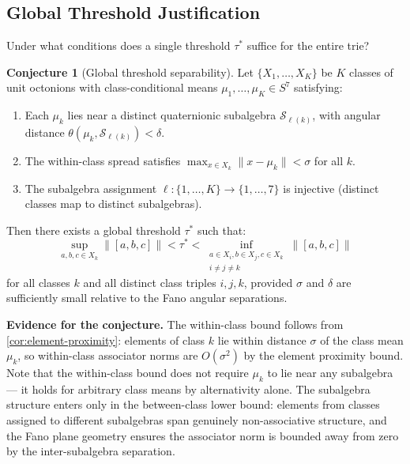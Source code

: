 \documentclass[11pt,a4paper]{article}
\theoremstyle{definition}
\newtheorem{conjecture}[theorem]{Conjecture}
\theoremstyle{remark}
\begin{document}
\subsection{Global Threshold Justification}
\label{sec:global-threshold}

Under what conditions does a single threshold $\tau^*$ suffice for the entire trie?

\begin{conjecture}[Global threshold separability]
\label{conj:global-threshold}
Let $\{X_1, \ldots, X_K\}$ be $K$ classes of unit octonions with class-conditional means $\mu_1, \ldots, \mu_K \in S^7$ satisfying:
\begin{enumerate}[nosep]
  \item Each $\mu_k$ lies near a distinct quaternionic subalgebra $\mathcal{S}_{\ell(k)}$, with angular distance $\theta(\mu_k, \mathcal{S}_{\ell(k)}) < \delta$.
  \item The within-class spread satisfies $\max_{x \in X_k} \lVert x - \mu_k \rVert < \sigma$ for all $k$.
  \item The subalgebra assignment $\ell: \{1, \ldots, K\} \to \{1, \ldots, 7\}$ is injective (distinct classes map to distinct subalgebras).
\end{enumerate}
Then there exists a global threshold $\tau^*$ such that:
\begin{equation}
  \sup_{a, b, c \in X_k} \lVert [a, b, c] \rVert < \tau^* < \inf_{\substack{a \in X_i, b \in X_j, c \in X_k \\ i \neq j \neq k}} \lVert [a, b, c] \rVert
\end{equation}
for all classes $k$ and all distinct class triples $i, j, k$, provided $\sigma$ and $\delta$ are sufficiently small relative to the Fano angular separations.
\end{conjecture}

\textbf{Evidence for the conjecture.} The within-class bound follows from \cref{cor:element-proximity}: elements of class $k$ lie within distance $\sigma$ of the class mean $\mu_k$, so within-class associator norms are $O(\sigma^2)$ by the element proximity bound. Note that the within-class bound does not require $\mu_k$ to lie near any subalgebra --- it holds for arbitrary class means by alternativity alone. The subalgebra structure enters only in the between-class lower bound: elements from classes assigned to different subalgebras span genuinely non-associative structure, and the Fano plane geometry ensures the associator norm is bounded away from zero by the inter-subalgebra separation.
\end{document}
